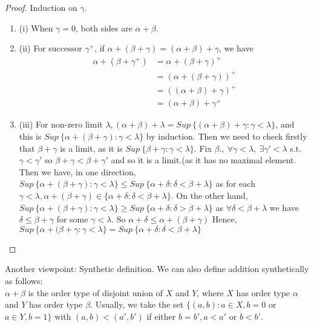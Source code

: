 \begin{proof} Induction on $\gamma$.
\begin{enumerate}
\item(i)  When $\gamma=0$, both sides are $\alpha+\beta$.\\
\item(ii) For successor $\gamma^+$, if $\alpha + (\beta + \gamma) = (\alpha + \beta) + \gamma$, we have
\begin{eqnarray*}
\alpha + (\beta + \gamma^+) &= \alpha + (\beta + \gamma)^+  \\
&= (\alpha + (\beta + \gamma))^+  \\
&= ((\alpha + \beta) + \gamma)^+  \\
&= (\alpha + \beta) + \gamma^+
\end{eqnarray*}
\item(iii) For non-zero limit $\lambda, (\alpha + \beta) + \lambda = Sup~ \{(\alpha + \beta) + \gamma: \gamma < \lambda\}$, and this is $Sup~ \{\alpha + (\beta + \gamma): \gamma < \lambda \}$ by induction.
Then we need to check firstly that $\beta + \gamma$ is a limit, as it is $Sup~ \{\beta + \gamma: \gamma < \lambda\}$. Fix $\beta., ~\forall \gamma < \lambda, ~\exists \gamma' < \lambda$ s.t. $\gamma < \gamma'$ so $\beta + \gamma < \beta + \gamma'$ and so it is a limit.(as it has no maximal element.\\

Then we have, in one direction, $Sup~ \{\alpha + (\beta +\gamma): \gamma < \lambda\} \le Sup~ \{\alpha + \delta: \delta < \beta + \lambda\}$ as for each $\gamma < \lambda, \alpha + (\beta + \gamma) \in \{\alpha + \delta: \delta < \beta + \lambda\}$. On the other hand, $Sup~ \{\alpha + (\beta +\gamma): \gamma < \lambda\} \ge Sup~ \{\alpha + \delta: \delta > \beta + \lambda\}$ as $\forall \delta < \beta + \lambda$ we have $\delta \le \beta + \gamma$ for some $\gamma < \lambda$. So $\alpha + \delta \le \alpha + (\beta + \gamma)$ Hence, $Sup~ \{\alpha + (\beta + \gamma: \gamma < \lambda\} = Sup~ \{\alpha + \delta: \delta < \beta + \lambda\}$
\end{enumerate}
\end{proof}
Another viewpoint: Synthetic definition.
We can also define addition synthetically as follows:\\
$\alpha + \beta$ is the order type of disjoint union of $X$ and $Y$,
where $X$ has order type $\alpha$ and $Y$ has order type $\beta$.
Usually, we take the set $\{(a,b): a \in X, b=0$ or $a \in Y, b=1\}$ with $(a,b) < (a',b ')$ if either $b=b ', a < a'$ or $b < b '$.
